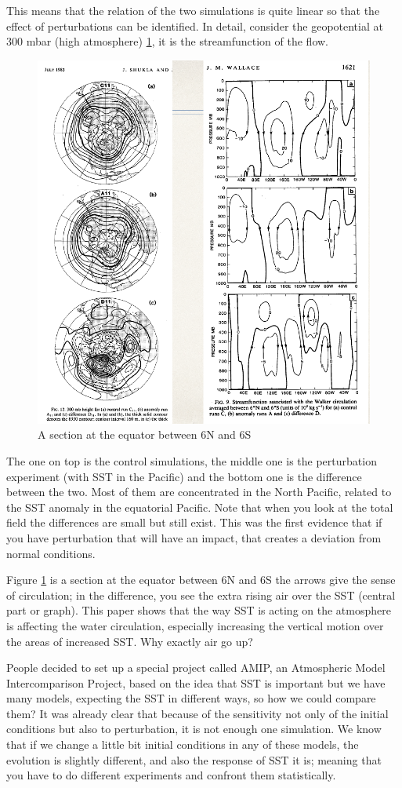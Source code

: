 This means that the relation of the two simulations is quite linear so that the effect of perturbations can be identified. In detail, consider the geopotential at 300 mbar (high atmosphere) \ref{fig:figure 1.7}, it is the streamfunction of the flow.
\begin{figure}[htpb]
	\centering
	\includegraphics[width=0.4\linewidth]{upload/Screenshot 2024-11-20 212453.png}
	\caption{A section at the equator between 6N and 6S }
	\label{fig:figure 1.7}
\end{figure}
The one on top is the control simulations, the middle one is the perturbation experiment (with SST in the Pacific) and the bottom one is the difference between the two.
Most of them are concentrated in the North Pacific, related to the SST anomaly in the equatorial Pacific. Note that when you look at the total field the differences are small but still exist.
This was the first evidence that if you have perturbation that will have an impact, that creates a deviation from normal conditions.

Figure \ref{fig:figure 1.7} is a section at the equator between 6N and 6S
the arrows give the sense of circulation; in the difference, you see the extra rising air over the SST (central part or graph). This paper shows that the way SST is acting on the atmosphere is affecting the water circulation, especially increasing the vertical motion over the areas of increased SST. Why exactly air go up?

People decided to set up a special project called AMIP, an Atmospheric Model Intercomparison Project, based on the idea that SST is important but we have many models, expecting the SST in different ways, so how we could compare them?
It was already clear that because of the sensitivity not only of the initial conditions but also to perturbation, it is not enough one simulation.
We know that if we change a little bit initial conditions in any of these models, the evolution is slightly different, and also the response of SST it is; meaning that you have to do different experiments and confront them statistically.

